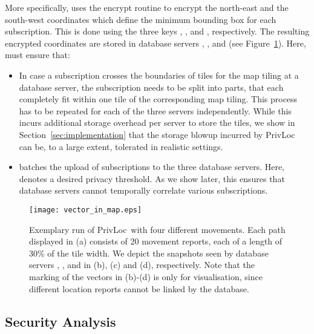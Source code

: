 \documentclass{llncs}
\newcommand\sol{{\sf PrivLoc}}
\begin{document}
More specifically,  uses the {\sf encrypt} routine to encrypt the north-east and the south-west coordinates which define the minimum bounding box for each subscription.
This is done using the three keys , , and , respectively. The resulting encrypted coordinates are stored in database servers , , and  (see Figure~\ref{fig:example}).
Here,  must ensure that:
\begin{itemize}
	\item In case a subscription crosses the boundaries of tiles for the map tiling at a database server, the subscription needs to be split into parts, that each completely fit within one tile of the corresponding map tiling. This process
has to be repeated for each of the three servers independently. While this incurs additional storage overhead per server to store the tiles, we show in Section~\ref{sec:implementation} that the storage blowup incurred by \sol{}
can be, to a large extent, tolerated in realistic settings.\item  batches the upload of  subscriptions to the three database servers. Here,  denotes a desired privacy threshold. As we show later, this ensures that database servers cannot temporally correlate various subscriptions.
\end{itemize}

\begin{figure}[tb]
	\centering
		\texttt{[image: vector\_in\_map.eps]}
		\caption{Exemplary run of {\sol}~with four different movements. Each path displayed in (a) consists of 20 movement reports, each of a length of 30\% of the tile width. We depict the snapshots seen by database servers , , and  in (b), (c) and (d), respectively. Note that the marking of the vectors in (b)-(d) is only for visualisation, since different location reports cannot be linked by the database. }
	\label{fig:example}
\end{figure}


\subsection{Security Analysis}\label{subsec:def}
\end{document}
